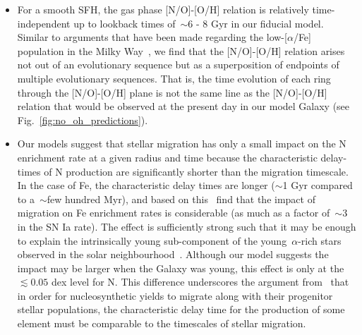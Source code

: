 \documentclass[ms.tex]{subfiles}
\begin{document}
\begin{itemize}
	\item For a smooth SFH, the gas phase [N/O]-[O/H] relation is relatively 
	time-independent up to lookback times of~$\sim$6 - 8 Gyr in our fiducial 
	model. 
	Similar to arguments that have been made regarding the low-[$\alpha$/Fe] 
	population in the Milky Way~\citep[e.g.][]{Schoenrich2009, Sharma2020, 
	Johnson2021}, we find that the [N/O]-[O/H] relation arises not out of an 
	evolutionary sequence but as a superposition of endpoints of multiple 
	evolutionary sequences. 
	That is, the time evolution of each ring through the [N/O]-[O/H] plane is 
	not the same line as the [N/O]-[O/H] relation that would be observed at the 
	present day in our model Galaxy (see Fig.~\ref{fig:no_oh_predictions}). 

	\item Our models suggest that stellar migration has only a small impact on 
	the N enrichment rate at a given radius and time because the characteristic 
	delay-times of N production are significantly shorter than the migration 
	timescale. 
	In the case of Fe, the characteristic delay times are longer ($\sim$1 Gyr 
	compared to a~$\sim$few hundred Myr), and based on this~\citet{Johnson2021} 
	find that the impact of migration on Fe enrichment rates is considerable 
	(as much as a factor of~$\sim$3 in the SN Ia rate). 
	The effect is sufficiently strong such that it may be enough to explain the 
	intrinsically young sub-component of the young~$\alpha$-rich stars observed 
	in the solar neighbourhood~\citep{Chiappini2015, Martig2015, Martig2016, 
	Jofre2016, Yong2016, Izzard2018, SilvaAguirre2018, Warfield2021}. 
	Although our model suggests the impact may be larger when the Galaxy was 
	young, this effect is only at the~$\lesssim0.05$ dex level for N. 
	This difference underscores the argument from~\citet{Johnson2021} that in 
	order for nucleosynthetic yields to migrate along with their progenitor 
	stellar populations, the characteristic delay time for the production of 
	some element must be comparable to the timescales of stellar migration. 


\end{itemize}
\end{document}
